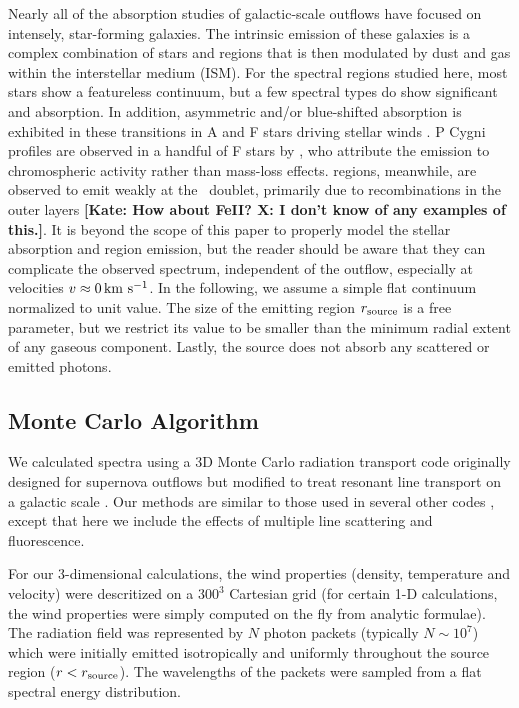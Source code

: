 \documentclass[12pt,preprint]{aastex}
\begin{document}
Nearly all of the absorption studies of galactic-scale outflows 
have focused on intensely, star-forming galaxies.  The
intrinsic emission of these galaxies is a complex combination of
stars and  regions that is then modulated by dust and gas
within the interstellar medium (ISM).  For the spectral regions studied
here, most stars show a featureless continuum, but a few spectral
types do show significant  and  absorption.
In addition, asymmetric and/or blue-shifted absorption is exhibited in these
transitions in A and F stars driving stellar winds \citep{sll+94}.
 P Cygni profiles are observed in a handful of F stars by \cite{sll+94}, who
attribute the emission to chromospheric activity rather than mass-loss effects.
 regions, meanwhile, are observed to emit weakly
at the \mgiid\ doublet, primarily due to recombinations in the outer
layers \citep{kbc+93} {\bf [Kate: How about FeII?  X: I don't know of any examples of this.]}.  
It is beyond the scope of this paper to
properly model the 
stellar absorption and  region emission, but the reader
should be aware that they can complicate the observed spectrum,
independent of the outflow, especially at velocities $v \approx 0 \, {\rm km~s^{-1}}$.
In the following, we assume a simple flat continuum 
normalized to unit value.  The size of the emitting
region $r_{\rm source}$ is a free parameter, but we restrict its value
to be smaller than the minimum radial extent of any gaseous
component.   Lastly, the source does not absorb any scattered or
emitted photons.


\subsection{Monte Carlo Algorithm}
\label{sec:monte}


We calculated spectra using a 3D Monte Carlo radiation transport code originally designed for supernova outflows  \cite{Kasen_2006} but  modified to treat resonant line transport  on a galactic scale \cite{Kasen_lyman}.  Our methods are similar to those used in several other codes \citep[e.g.,][]{Zheng_2002,Dijkstra_2006,Verhame_2006,Laursen_2009}, except that here we include the effects of multiple line scattering and fluorescence.

For our 3-dimensional calculations, the  wind properties (density, temperature and velocity) were descritized on a $300^3$ Cartesian grid (for certain 1-D calculations, the wind properties were simply computed on the fly from analytic formulae).   
The radiation field was represented by $N$ photon packets (typically $N \sim 10^7$) which were initially emitted isotropically and uniformly throughout the source region ($r < r_{\rm source}$).  The wavelengths of the packets were sampled from a flat spectral energy distribution. 
\end{document}
